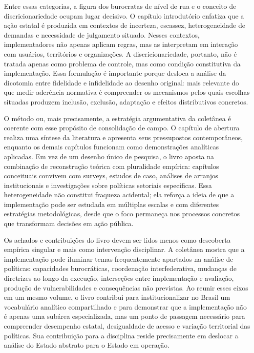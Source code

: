 \documentclass[12pt,a4paper]{article}
\begin{document}
Entre essas categorias, a figura dos burocratas de nível de rua e o conceito de discricionariedade ocupam lugar decisivo. O capítulo introdutório enfatiza que a ação estatal é produzida em contextos de incerteza, escassez, heterogeneidade de demandas e necessidade de julgamento situado. Nesses contextos, implementadores não apenas aplicam regras, mas as interpretam em interação com usuários, territórios e organizações. A discricionariedade, portanto, não é tratada apenas como problema de controle, mas como condição constitutiva da implementação. Essa formulação é importante porque desloca a análise da dicotomia entre fidelidade e infidelidade ao desenho original: mais relevante do que medir aderência normativa é compreender os mecanismos pelos quais escolhas situadas produzem inclusão, exclusão, adaptação e efeitos distributivos concretos. \parencite{lotta2019_teorias_analises}

O método ou, mais precisamente, a estratégia argumentativa da coletânea é coerente com esse propósito de consolidação de campo. O capítulo de abertura realiza uma síntese da literatura e apresenta seus pressupostos contemporâneos, enquanto os demais capítulos funcionam como demonstrações analíticas aplicadas. Em vez de um desenho único de pesquisa, o livro aposta na combinação de reconstrução teórica com pluralidade empírica: capítulos conceituais convivem com surveys, estudos de caso, análises de arranjos institucionais e investigações sobre políticas setoriais específicas. Essa heterogeneidade não constitui fraqueza acidental; ela reforça a ideia de que a implementação pode ser estudada em múltiplas escalas e com diferentes estratégias metodológicas, desde que o foco permaneça nos processos concretos que transformam decisões em ação pública. \parencite{lotta2019_teorias_analises}

Os achados e contribuições do livro devem ser lidos menos como descoberta empírica singular e mais como intervenção disciplinar. A coletânea mostra que a implementação pode iluminar temas frequentemente apartados na análise de políticas: capacidades burocráticas, coordenação interfederativa, mudanças de diretrizes ao longo da execução, interseções entre implementação e avaliação, produção de vulnerabilidades e consequências não previstas. Ao reunir esses eixos em um mesmo volume, o livro contribui para institucionalizar no Brasil um vocabulário analítico compartilhado e para demonstrar que a implementação não é apenas uma subárea especializada, mas um ponto de passagem necessário para compreender desempenho estatal, desigualdade de acesso e variação territorial das políticas. Sua contribuição para a disciplina reside precisamente em deslocar a análise do Estado abstrato para o Estado em operação. \parencite{lotta2019_teorias_analises}
\end{document}
